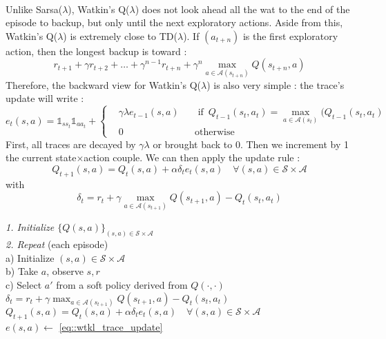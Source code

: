 \documentclass[a4paper]{article}
\newcommand\mS{\mathcal{S}}
\newcommand\mA{\mathcal{A}}
\newcommand\tdl{TD($\lambda$)}
\newcommand\srsl{Sarsa($\lambda$)}
\newcommand\wtkl{Watkin's Q($\lambda$)}
\begin{document}
{{			\paragraph{} Unlike \srsl{},  \wtkl{} does not look ahead all the wat to the end of the episode to backup, but only until the next exploratory actions. Aside from this, \wtkl{} is extremely close to \tdl{}. If $(a_{t+n})$ is the first exploratory action, then the longest backup is toward : 
			\begin{equation}
				r_{t+1} + \gamma r_{t+2} + \hdots + \gamma^{n-1} r_{t+n} + \gamma ^n \max_{a\in\mA(s_{t+n})} Q(s_{t+n},a)
			\end{equation}
			Therefore, the backward view for \wtkl{} is also very simple : the trace's update will write : 
			\begin{equation}
				e_t(s,a) = \mathds{1}_{ss_t}\mathds{1}_{aa_t} + 
					\left\{
					\begin{aligned}
						&\gamma \lambda e_{t-1}(s,a) &&\text{ if }\,  Q_{t-1}(s_t,a_t) = \max_{a\in\mA(s_t)}(Q_{t-1}(s_t,a_t) \\
						& 0 &&\text{otherwise}
					\end{aligned}
					\right. 
					\label{eq::wtkl_trace_update}
			\end{equation}
			First, all traces are decayed by $\gamma \lambda$ or brought back to $0$. Then we increment by 1 the current state$\times$action couple. 
			We can then apply the update rule : 
			\begin{equation}
				Q_{t+1}(s,a) = Q_t(s,a) + \alpha \delta_t e_t(s,a) \quad \forall(s,a)\in\mS\times\mA
			\end{equation}
			with 
			\begin{equation}
				\delta_t = r_t + \gamma \max_{a\in\mA(s_{t+1})}Q(s_{t+1},a) - Q_t(s_t,a_t)
			\end{equation}
			\vspace{10pt}
			
			\coolbox{white}{\textcolor{blue}{\wtkl}}
				{
					\begin{algorithm}[H]
	 				\SetAlgoLined
					\LinesNumbered
					 \textsf{\emph{1. Initialize $\{Q(s,a)\}_{(s,a)\in\mS\times\mA}$ }} \\
					\textsf{\emph{2. Repeat}} (each episode) \\
					\Indp \Indp a) Initialize $(s,a)\in\mS\times\mA$ \\
						  	  b) Take $a$, observe $s,r$ \\
							  c) Select $a'$ from a soft policy derived from $Q(\cdot,\cdot)$\\
							  \Indp \Indp 
							  	$\delta_t = r_t + \gamma \max_{a\in\mA(s_{t+1})}Q(s_{t+1},a) - Q_t(s_t,a_t)$ \\
								$Q_{t+1}(s,a) = Q_t(s,a) + \alpha \delta_t e_t(s,a) \quad \forall(s,a)\in\mS\times\mA$\\
								$ e(s,a) \leftarrow$ \eqref{eq::wtkl_trace_update}


\end{algorithm}}}}
\end{document}
